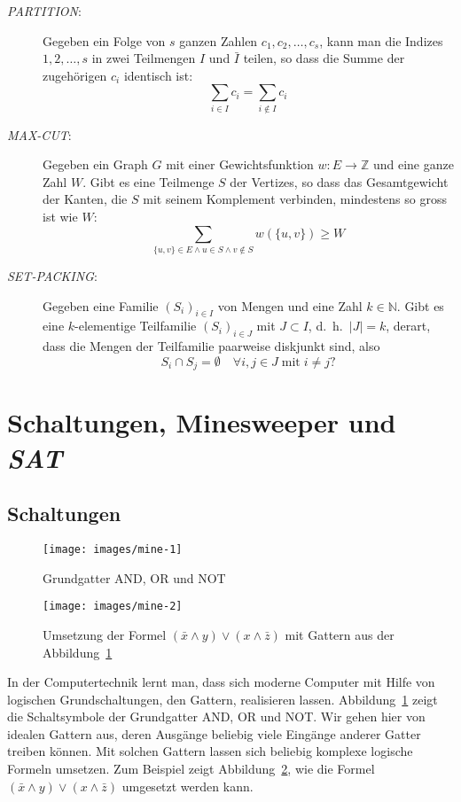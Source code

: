 \begin{description}
\[\]
\item[\textsl{PARTITION}:] Gegeben ein Folge von $s$ ganzen Zahlen
$c_1,c_2,\dots,c_s$, kann man die Indizes $1,2,\dots,s$ in zwei
Teilmengen $I$ und $\bar I$ teilen, so dass die Summe der zugehörigen
$c_i$ identisch ist:
\[
\sum_{i\in I}c_i=\sum_{i\not\in I}c_i
\]
\item[\textsl{MAX-CUT}:] Gegeben ein Graph $G$ mit einer Gewichtsfunktion
$w\colon E\to\mathbb Z$ und eine ganze Zahl $W$.
Gibt es eine Teilmenge
$S$ der Vertizes, so dass das Gesamtgewicht der Kanten, die $S$ mit
seinem Komplement verbinden, mindestens so gross ist wie $W$:
\[
\sum_{\{u,v\}\in E\wedge u\in S\wedge v\not\in S} w(\{u,v\})\ge W
\]
\item[\textsl{SET-PACKING}:] Gegeben eine Familie $(S_i)_{i\in I}$ von
Mengen und eine Zahl $k\in \mathbb N$.
Gibt es eine $k$-elementige Teilfamilie $(S_i)_{i\in J}$ mit $J\subset I$,
d.~h.~$|J|=k$,
derart,
dass die Mengen der Teilfamilie paarweise diskjunkt sind, also 
\[
	S_i \cap S_j = \emptyset \quad\forall i,j\in J \;\text{mit}\; i\ne j?
\]
\end{description}



\section{Schaltungen, Minesweeper und \textsl{SAT}}
\subsection{Schaltungen}
\begin{figure}
\begin{center}
\texttt{[image: images/mine-1]}
\end{center}
\caption{Grundgatter AND, OR und NOT\label{gatter}}
\end{figure}%
\begin{figure}
\begin{center}
\texttt{[image: images/mine-2]}
\end{center}
\caption{Umsetzung der Formel
$(\bar x\wedge y)\vee(x\wedge \bar z)$ mit Gattern aus der
Abbildung~\ref{gatter}\label{gatterformel}}
\end{figure}%
In der Computertechnik lernt man, dass sich moderne Computer mit
Hilfe von logischen Grundschaltungen, den Gattern, realisieren lassen.
Abbildung~\ref{gatter} zeigt die Schaltsymbole der Grundgatter AND, OR
und NOT. Wir gehen hier von idealen Gattern aus, deren Ausgänge beliebig
viele Eingänge anderer Gatter treiben können. Mit solchen Gattern
lassen sich beliebig komplexe logische Formeln umsetzen. Zum Beispiel
zeigt Abbildung~\ref{gatterformel}, wie die Formel
$(\bar x\wedge y)\vee(x\wedge \bar z)$ umgesetzt werden kann.

